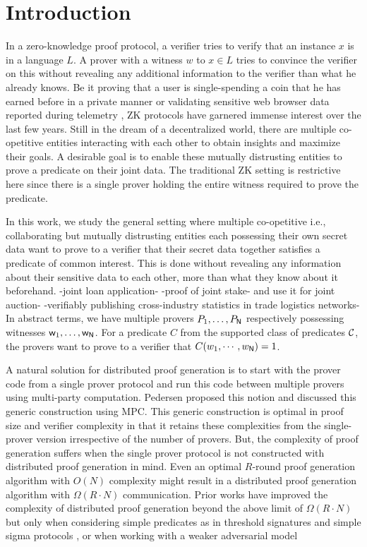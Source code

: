 \section{Introduction} \label{sec:intro}
In a zero-knowledge proof protocol, a verifier tries to verify that an instance $x$ is in a language $L$. A prover with a witness $w$ to $x \in L$ tries to convince the verifier on this without revealing any additional information to the verifier than what he already knows. Be it proving that a user is single-spending a coin that he has earned before in a private manner \cite{zerocash} or validating sensitive web browser data reported during telemetry \cite{MozillaPrio}, ZK protocols have garnered immense interest over the last few years. Still in the dream of a decentralized world, there are multiple co-opetitive entities interacting with each other to obtain insights and maximize their goals. A desirable goal is to enable these mutually distrusting entities to prove a predicate on their joint data. The traditional ZK setting is restrictive here since there is a single prover holding the entire witness required to prove the predicate. 

In this work, we study the general setting where multiple co-opetitive i.e., collaborating but mutually distrusting entities each possessing their own secret data want to prove to a verifier that their secret data together satisfies a predicate of common interest. This is done without revealing any information about their sensitive data to each other, more than what they know about it beforehand. 
-joint loan application-
-proof of joint stake- and use it for joint auction-
-verifiably publishing cross-industry statistics in trade logistics networks-
In abstract terms, we have multiple provers $P_1, \ldots, P_{\mathsf{N}}$ respectively possessing witnesses $\mathsf{w}_1, \ldots, \mathsf{w}_{\mathsf{N}}$. For a predicate $C$ from the supported class of predicates ${\cal C}$, the provers want to prove to a verifier that $C(w_1,\cdots,w_{\mathsf{N}}) = 1$.

A natural solution for distributed proof generation is to start with the prover code from a single prover protocol and run this code between multiple provers using multi-party computation. Pedersen \cite{Ped92} proposed this notion and discussed this generic construction using MPC.
This generic construction is optimal in proof size and verifier complexity in that it retains these complexities from the single-prover version irrespective of the number of provers. But, the complexity of proof generation suffers when the single prover protocol is not constructed with distributed proof generation in mind. Even an optimal $R$-round proof generation algorithm with $O(N)$ complexity  might result in a distributed proof generation algorithm with $\Omega(R \cdot N)$ communication.
Prior works have improved the complexity of distributed proof generation beyond the above limit of $\Omega(R \cdot N)$ but only when considering simple predicates as in threshold signatures \cite{DDS} and simple sigma protocols \cite{EfficientTZ}, or when working with a weaker adversarial model \cite{trinocchio}

